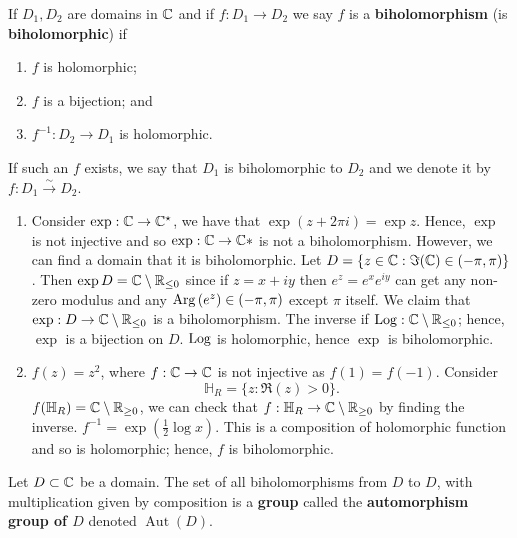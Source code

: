 \begin{definition}[Biholomorphic]
    If $D_1, D_2$ are domains in $\mathbb{C}$ and if $f: D_1 \to D_2$ we say $f$ is a  \textbf{biholomorphism} (is \textbf{biholomorphic}) if
    \begin{enumerate}
        \item $f$ is holomorphic;
        \item $f$ is a bijection; and
        \item $f^{-1}: D_2 \to D_1$ is holomorphic.
    \end{enumerate}
    If such an $f$ exists, we say that $D_1$ is biholomorphic to $D_2$ and we denote it by $f: D_1 \xrightarrow{\sim} D_2$.
\end{definition}

\begin{example}
    \begin{enumerate}
        \item Consider $\exp: \mathbb{C} \to \mathbb{C}^\star$, we have that $\exp(z + 2\pi i) = \exp{z}$. 
            Hence, $\exp$ is not injective and so $\exp: \mathbb{C} \to \mathbb{C}*$ is not a biholomorphism. 
            However, we can find a domain that it is biholomorphic. 
            Let $D = \{ z \in \mathbb{C} : \Im(\mathbb{C}) \in (-\pi, \pi) \}$. 
            Then $\exp{D} = \mathbb{C} \setminus \mathbb{R}_{\leq 0}$ since if $z = x + iy$ then $e^z = e^x e^{iy}$ can get any non-zero modulus and any $\operatorname{Arg}{(e^z)} \in (-\pi, \pi)$ except $\pi$ itself. 
            We claim that 
            $\exp: D \to \mathbb{C} \setminus \mathbb{R}_{\leq 0}$ 
            is a biholomorphism. 
            The inverse if $\operatorname{Log}: \mathbb{C} \setminus \mathbb{R}_{\leq 0}$; hence, $\exp$ is a bijection on $D$. 
            $\operatorname{Log}$ is holomorphic, hence $\exp$ is biholomorphic.

        \item $f(z) = z^2$, where $f: \mathbb{C} \to \mathbb{C}$ is not injective as $f(1) = f(-1)$.
            Consider
            \[ \mathbb H_R = \{ z : \Re{(z)} > 0 \}. \]
            $f(\mathbb H_R) = \mathbb{C} \setminus\mathbb{R}_{\geq 0}$, 
            we can check that 
            $f: \mathbb H_R \to \mathbb{C}\setminus\mathbb{R}_{\geq 0}$ 
            by finding the inverse.
            $f^{-1} = \exp{\left(\frac12\log{x}\right)}$.
            This is a composition of holomorphic function and so is holomorphic; hence, $f$ is biholomorphic.
    \end{enumerate}
\end{example}

\begin{lemma}
    Let $D \subset \mathbb{C}$ be a domain. The set of all biholomorphisms from $D$ to $D$, with multiplication given by composition is a \textbf{group} called the \textbf{automorphism group of $D$} denoted $\operatorname{Aut}{(D)}$.
\end{lemma}

